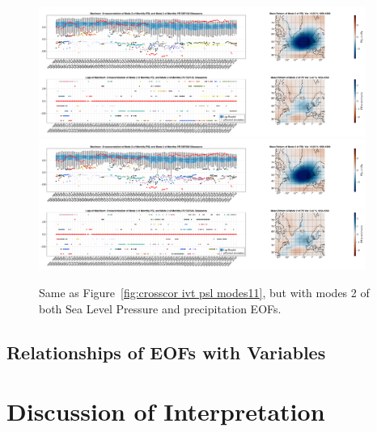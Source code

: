 \begin{figure}
  \begin{center}
    \includegraphics[width=0.95\textwidth]{figures/crosscorrelation_boxplot_psl_pr_modes22_ssp126_50seasons.png}
    \includegraphics[width=0.95\textwidth]{figures/crosscorrelation_boxplot_psl_pr_modes22_ssp585_50seasons.png}
  \end{center}
  \caption{Same as Figure~\ref{fig:crosscor ivt psl modes11}, but with modes 2 of both Sea Level Pressure and precipitation EOFs.}\label{fig:crosscor psl pr modes22}

\end{figure}




\subsection{Relationships of EOFs with Variables}


\section{Discussion of Interpretation}
\label{sec:discussion}
